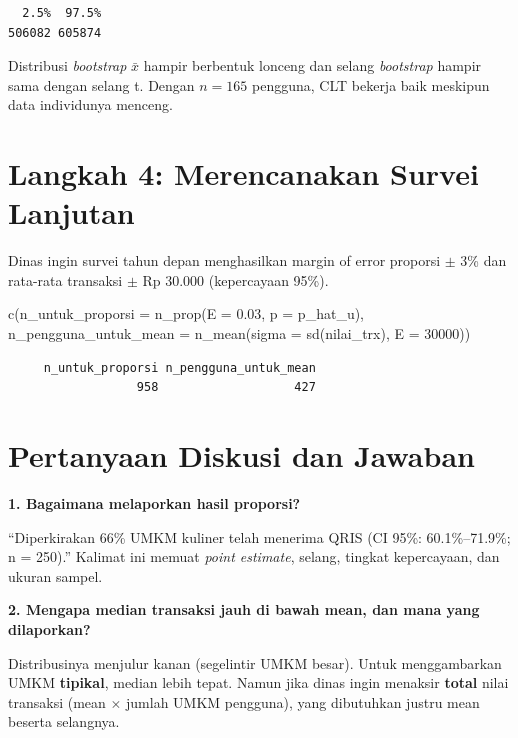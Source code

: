 \documentclass[
  indonesian,
  letterpaper,
]{book}
\newenvironment{Shaded}{\begin{snugshade}}{\end{snugshade}}
\newcommand{\AttributeTok}[1]{\textcolor[rgb]{0.40,0.45,0.13}{#1}}
\newcommand{\DecValTok}[1]{\textcolor[rgb]{0.68,0.00,0.00}{#1}}
\newcommand{\FloatTok}[1]{\textcolor[rgb]{0.68,0.00,0.00}{#1}}
\newcommand{\FunctionTok}[1]{\textcolor[rgb]{0.28,0.35,0.67}{#1}}
\newcommand{\NormalTok}[1]{\textcolor[rgb]{0.00,0.23,0.31}{#1}}
\begin{document}
\begin{verbatim}
  2.5%  97.5% 
506082 605874 
\end{verbatim}

Distribusi \emph{bootstrap} \(\bar{x}\) hampir berbentuk lonceng dan
selang \emph{bootstrap} hampir sama dengan selang t. Dengan \(n = 165\)
pengguna, CLT bekerja baik meskipun data individunya menceng.

\section{Langkah 4: Merencanakan Survei
Lanjutan}\label{langkah-4-merencanakan-survei-lanjutan}

Dinas ingin survei tahun depan menghasilkan margin of error proporsi
\(\pm\) 3\% dan rata-rata transaksi \(\pm\) Rp 30.000 (kepercayaan
95\%).

\begin{Shaded}
\begin{Highlighting}[]
\FunctionTok{c}\NormalTok{(}\AttributeTok{n\_untuk\_proporsi =} \FunctionTok{n\_prop}\NormalTok{(}\AttributeTok{E =} \FloatTok{0.03}\NormalTok{, }\AttributeTok{p =}\NormalTok{ p\_hat\_u),}
  \AttributeTok{n\_pengguna\_untuk\_mean =} \FunctionTok{n\_mean}\NormalTok{(}\AttributeTok{sigma =} \FunctionTok{sd}\NormalTok{(nilai\_trx), }\AttributeTok{E =} \DecValTok{30000}\NormalTok{))}
\end{Highlighting}
\end{Shaded}

\begin{verbatim}
     n_untuk_proporsi n_pengguna_untuk_mean 
                  958                   427 
\end{verbatim}

\section{Pertanyaan Diskusi dan
Jawaban}\label{pertanyaan-diskusi-dan-jawaban}

\textbf{1. Bagaimana melaporkan hasil proporsi?}

``Diperkirakan 66\% UMKM kuliner telah menerima QRIS (CI 95\%:
60.1\%--71.9\%; n = 250).'' Kalimat ini memuat \emph{point estimate},
selang, tingkat kepercayaan, dan ukuran sampel.

\textbf{2. Mengapa median transaksi jauh di bawah mean, dan mana yang
dilaporkan?}

Distribusinya menjulur kanan (segelintir UMKM besar). Untuk
menggambarkan UMKM \textbf{tipikal}, median lebih tepat. Namun jika
dinas ingin menaksir \textbf{total} nilai transaksi (mean \(\times\)
jumlah UMKM pengguna), yang dibutuhkan justru mean beserta selangnya.
\end{document}
